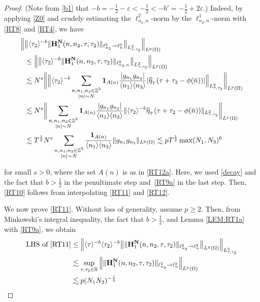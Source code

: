 \documentclass[%
11pt,  reqno]{amsart}
\newcommand{\1}{\hspace{0.2mm}\text{I}\hspace{0.2mm}}
\newcommand{\noi}{\noindent}
\newcommand{\Z}{\mathbb{Z}}
\newcommand{\R}{\mathbb{R}}
\newcommand{\eps}{\varepsilon}
\newcommand{\ft}{\widehat}
\renewcommand{\l}{\ell}
\renewcommand{\O}{\Omega}
\newcommand{\les}{\lesssim}
\newcommand{\jb}[1]
{\langle #1 \rangle}
\newcommand{\ind}{\mathbf 1}
\numberwithin{equation}{section}
\numberwithin{theorem}{section}
\newcommand{\Hb}{\mathbf{H}}
\begin{document}
\begin{proof}
\noi
(Note from \eqref{b1} that $- b = -\frac 12 - \eps < -\frac 12 < -b' = - \frac 12 + 2\eps$.)
Indeed, 
by applying  \eqref{Z0}
and
crudely estimating
the $\l^2_{n_2, n}$-norm 
by the $\l^1_{n_2, n}$-norm
with \eqref{RT8} and \eqref{RT4}, 
 we have
\begin{align}
\begin{split}
\Big\| & \big\| \jb{\tau_2}^{-b} 
\| \Hb_1^{\bf N}(n,n_2,\tau, \tau_2) \|_{\l^2_{n_2} \to \l^2_n} \big\|_{L^2_{\tau , \tau_2}} \Big\|_{L^p (\O)} \\
& \le \Big\| \big\| \jb{\tau_2}^{-b} 
\| \Hb_1^{\bf N} (n,n_2,\tau, \tau_2) \|_{\l^2_{n_2, n} } \big\|_{L^2_{\tau, \tau_2}} \Big\|_{L^p (\O)} \\
& \les N^s \bigg\| \Big\|  \jb{\tau_2}^{-b} 
 \sum_{\substack{n, n_1,n_2 \in \Z^2 \\ |n| \sim N}}
\ind_{A(n)}
\frac{|g_{n_1}  {g_{n_3} }| }{\jb{n_1}\jb{n_3}}
|\ft \eta_{_T} (\tau + \tau_2 - \phi (\bar n)) |
 \Big\|_{ L^2_{\tau, \tau_2}} \bigg\|_{L^p (\O)} \\
& \les N^s \bigg\|  \sum_{\substack{n, n_1,n_2 \in \Z^2 \\ |n| \sim N}}
\ind_{A(n)}
\frac{|g_{n_1}g_{n_3} |  }{\jb{n_1}\jb{n_3}}
\|  \jb{\tau_2}^{-b}
\ft\eta_{_T} (\tau + \tau_2 - \phi (\bar n)) 
\|_{ L^2_{\tau, \tau_2}} \bigg\|_{L^p (\O)} \\
& \les T^\frac 12 N^s \sum_{\substack{n, n_1,n_2 \in \Z^2 \\ |n| \sim N}}
\frac{\ind_{A(n)}}{\jb{n_1}\jb{n_3}}
\|g_{n_1}  g_{n_3} \|_{L^p (\O)} \les p T^\frac 12  \max(N_1,N_3)^{6}
\end{split}
\label{RT12}
\end{align}

\noi 
for small $s >  0$, 
where the set 
$A(n)$ is as in \eqref{RT12a}.
Here, 
we used \eqref{decay} and 
the fact that  $b > \frac 12$ in the penultimate step
and~\eqref{RT9a}
in the last step.
Then, \eqref{RT10} follows from interpolating \eqref{RT11} and \eqref{RT12}. 


We now prove \eqref{RT11}.
Without loss of generality, assume $p \ge 2 $.
Then, 
from Minkowski's integral inequality, 
the fact that $b > \frac 12$, 
and 
 Lemma \ref{LEM:RT1a} with \eqref{RT9a}, 
 we obtain
\begin{align}
\begin{split}
\text{LHS of \eqref{RT11}}
& \le 
\Big\|  \jb{\tau}^{-b} \jb{\tau_2}^{-b} 
\big\|
\| \Hb_1^{\bf N} (n,n_2,\tau, \tau_2) \|_{\l^2_{n_2} \to \l^2_n} 
\big\|_{L^p (\O)} 
\Big\|_{L^2_{\tau, \tau_2}} \\
& \les 
\sup_{\tau, \tau_2 \in \R}
\Big\|
\| \Hb_1^{\bf N} (n,n_2,\tau, \tau_2) \|_{\l^2_{n_2} \to \l^2_n} 
\Big\|_{L^p (\O)} \\
& \les p (N_1N_3)^{-\frac 14}
\end{split}
\label{RT13}
\end{align}


\end{proof}
\end{document}
